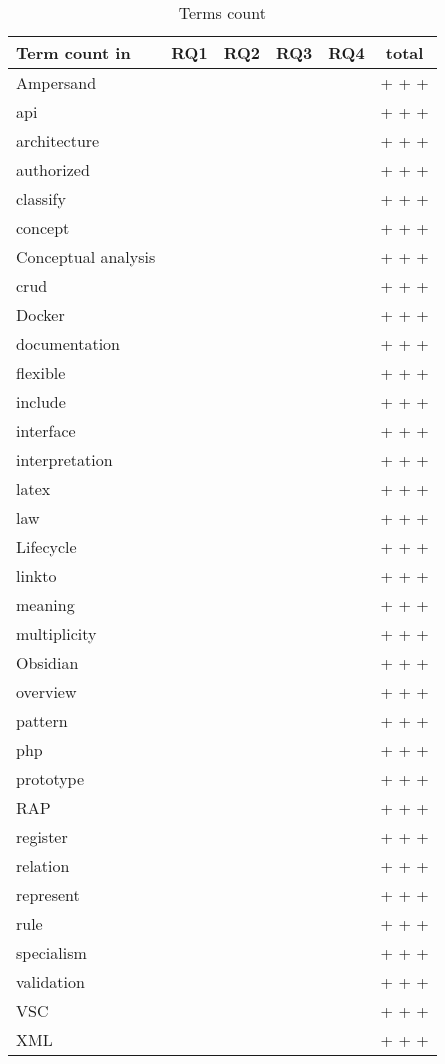 \newcommand\tottab[1]{{#1} & \the\value{RQ1-#1} & \the\value{RQ2-#1} & \the\value{RQ3-#1} & \the\value{RQ4-#1} & \xintexpr \the\value{RQ1-#1} + \the\value{RQ2-#1} +\the\value{RQ3-#1} +\the\value{RQ4-#1} \relax \\ \hline}

\begin{table}[H]
    \begin{tabular}{ || l | c | c | c |c|c||}
        \hline
        Term count in & RQ1 & RQ2 & RQ3 & RQ4 & total\\
        \hline\hline
    
        \tottab{Ampersand} 
        \tottab{api}
        \tottab{architecture}
        \tottab{authorized}
        \tottab{classify}      
        \tottab{concept}
        \tottab{Conceptual analysis}
        \tottab{crud}           
        \tottab{Docker}   
        \tottab{documentation}
        \tottab{flexible}    
        \tottab{include}
        \tottab{interface} 
        \tottab{interpretation}
        \tottab{latex}   
        \tottab{law}
        \tottab{Lifecycle}
        \tottab{linkto}        
        \tottab{meaning}
        \tottab{multiplicity}  
        \tottab{Obsidian}
        \tottab{overview}
        \tottab{pattern}
        \tottab{php}
        \tottab{prototype}
        \tottab{RAP}     
        \tottab{register}
        \tottab{relation}
        \tottab{represent}      
        \tottab{rule}
        \tottab{specialism}
        \tottab{validation}
        \tottab{VSC}
        \tottab{XML}
    
    \end{tabular}
    \caption{\label{tab:table-totalCounts}Terms count}
\end{table}
